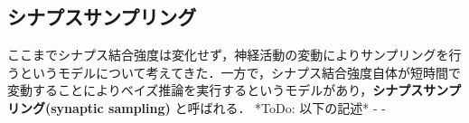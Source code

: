 \subsection{シナプスサンプリング}ここまでシナプス結合強度は変化せず，神経活動の変動によりサンプリングを行うというモデルについて考えてきた．一方で，シナプス結合強度自体が短時間で変動することによりベイズ推論を実行するというモデルがあり，\textbf{シナプスサンプリング(synaptic sampling)} と呼ばれる．
*ToDo: 以下の記述*
- \cite{Kappel2015-kq}
- \cite{Aitchison2021-wo}